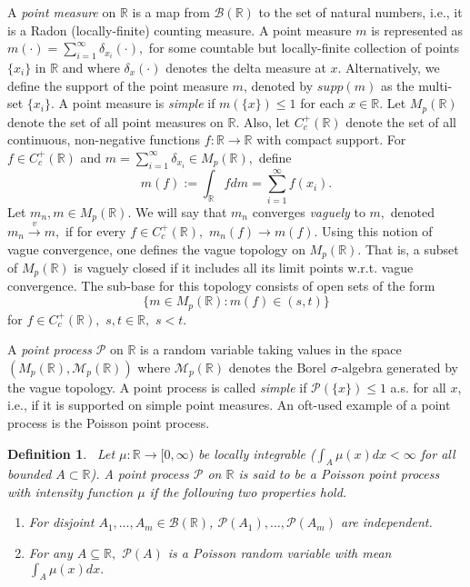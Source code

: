 \documentclass[12pt]{amsart}
\newcommand{\gt}[1]{\textcolor{blue}{#1}}
\renewcommand{\gt}[1]{#1}
\newtheorem{definition}[theorem]{Definition}
\numberwithin{equation}{section}
\numberwithin{theorem}{section}
\newcommand{\Real}{\mathbb R}
\newcommand{\1}{\mathbf{1}}
\def\M{\mathcal{M}}
\def\sP{\mathscr{P}}
\def\bR{\mathbb{R}}
\def\ccR{C_{c}^{+}(\bR)}
\def\borR{\mathcal{B}(\mathbb{R})}
\begin{document}
A {\em point measure} on $\Real$ is a map from $\borR$ to the set of natural numbers, i.e., it is a Radon (locally-finite) counting measure. A point measure $m$ is represented as $m(\cdot) = \sum_{i = 1}^{\infty} \delta_{x_i} (\cdot),$ for some countable but locally-finite collection of points $\{x_i\}$ in $\bR$ and where $\delta_x(\cdot)$ denotes the delta measure at $x$. Alternatively, we define the support of the point measure $m$, denoted by $supp(m)$ as the multi-set $\{x_i\}$. A point measure is {\em simple} if $m(\{x\}) \leq 1$ for each $x \in \bR.$ Let $M_{p}(\bR)$ denote the set of all point measures on $\bR$. Also, let $\ccR$ denote the set of all continuous, non-negative functions $f: \bR \to \bR$ with compact support. For $f \in \ccR$ and $m = \sum_{i = 1}^{\infty} \delta_{x_i} \in M_{p}(\bR),$ define
%
\begin{equation}
\label{eqn:exp_wrt_pointm}
m(f) := \int_{\bR} f dm = \sum_{i = 1}^{\infty} f(x_i).
\end{equation}
%
Let $m_{n}, m \in M_{p}(\bR).$ We will say that $m_{n}$ converges {\em vaguely} to $m,$ denoted $m_{n} \overset{v}{\to} m,$ if for every $f \in \ccR,$ $ m_{n}(f) \to m(f)$. Using this notion of vague convergence, one defines the vague topology  on $M_{p}(\bR).$ That is, a subset of $M_{p}(\bR)$ is vaguely closed if it includes all its limit points w.r.t. vague convergence. The sub-base for this topology consists of open sets of the form
%
\[
\{m \in M_{p}(\bR) : m(f) \in (s, t)\}
\]
%
for $f \in \ccR, \, \, s, t \in \bR, \, \, s < t.$

A {\em point process} $\sP$ on $\bR$ is a random variable taking values in the space $(M_{p}(\bR), \M_{p}(\bR))$ where $\M_{p}(\bR)$ denotes the Borel $\sigma$-algebra generated by the vague topology. A point process is called {\em simple} if $\sP(\{x\}) \leq 1$ a.s. \gt{for all $x$, i.e., if it is} supported on simple point measures. An oft-used example of a point process is the Poisson point process.
%		
\begin{definition}
\
Let $\mu : \bR \to [0, \infty)$ be locally integrable ($\int_{A} \mu(x) dx < \infty$ for all bounded $A \subset \bR$). A point process $\sP$ on $\bR$ is said to be a {\em Poisson point process} with intensity function $\mu$  if the following two properties hold.
\begin{enumerate}
\item For disjoint $A_1,\ldots,A_m \in \borR$, $\sP(A_1), \ldots, \sP(A_m)$ are independent.

\item For any $A \subseteq \bR,$ $\sP(A)$ is a Poisson random variable with mean $\int_{A} \mu(x) dx.$
\end{enumerate}
\end{definition}
%
\end{document}
